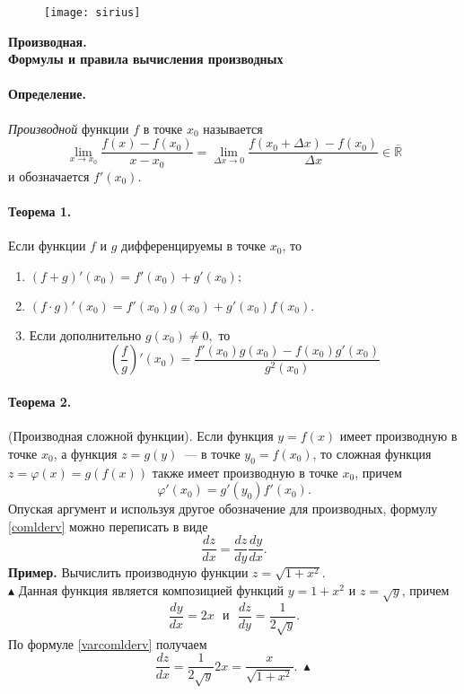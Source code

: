 \documentclass[a4paper,12pt]{article} %
\begin{document}

\begin{figure}[h!]
	\hfill
	\texttt{[image: sirius]}
\end{figure}
\vspace{5ex}
\begin{center}
	\Large\textbf{Производная.\\
		Формулы и правила вычисления производных} 
\end{center}

\paragraph*{Определение.}\textit{Производной} функции
$ f $ в точке $ x_0 $ называется 
\[
	\lim\limits_
	{x\rightarrow x_0}\dfrac{f(x)-f(x_0)}{x-x_0}=
	\lim\limits_{\Delta x\rightarrow0}
	\dfrac{f(x_0+\Delta x)-f(x_0)}{\Delta x}\in\mathbb{\overline{R}}
\]
и обозначается $ f'(x_0) $.
\paragraph{Теорема 1.}Если функции $ f $ и $ g $ 
дифференцируемы в точке $ x_0 $, то
\begin{enumerate}
	\item $ (f+g)'(x_0)=f'(x_0)+g'(x_0); $
	\item $ (f\cdot g)'(x_0)=f'(x_0)g(x_0)+g'(x_0)f(x_0). $
	\item Если дополнительно $ g(x_0)\ne0, $ то
	\[
		\left(\dfrac{f}{g}\right)'(x_0)=
		\dfrac{f'(x_0)g(x_0)-f(x_0)g'(x_0)}{g^2(x_0)}
	\]
\end{enumerate}
\paragraph{Теорема 2.}(Производная сложной функции).
Если функция $ y=f(x) $ имеет производную в точке $ x_0 $,
а функция $ z=g(y) $~--- в точке $ y_0=f(x_0) $, то сложная
функция $ z=\varphi(x)=g(f(x)) $ также имеет производную в
точке $ x_0 $, причем
\begin{equation}\label{comlderv}
	\varphi'(x_0)=g'(y_0)f'(x_0).
\end{equation}
Опуская аргумент и используя другое обозначение для 
производных, формулу \eqref{comlderv} можно переписать
в виде
\begin{equation}\label{varcomlderv}
	\dfrac{dz}{dx}=\dfrac{dz}{dy}\dfrac{dy}{dx}.
\end{equation}
\textbf{Пример.} Вычислить производную функции
$ z=\sqrt{1+x^2} $.\\
$ \blacktriangle $ Данная функция является композицией 
функций $ y=1+x^2 $ и $ z=\sqrt{y} $, причем 
\[
	\dfrac{dy}{dx}=2x~~~и~~~\dfrac{dz}{dy}=
	\dfrac{1}{2\sqrt{y}}.
\]
По формуле \eqref{varcomlderv} получаем 
\[
	\dfrac{dz}{dx}=\dfrac{1}{2\sqrt{y}}2x=
	\dfrac{x}{\sqrt{1+x^2}}.~\blacktriangle
\]
\end{document}
